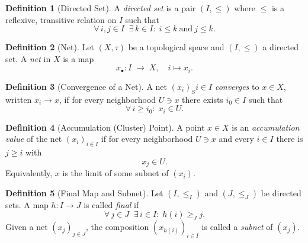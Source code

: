 \documentclass[11pt,a4paper]{article}
\theoremstyle{definition}
\newtheorem{definition}{Definition}[section]
\theoremstyle{plain}
\theoremstyle{remark}
\begin{document}
\begin{definition}[Directed Set]
A \emph{directed set} is a pair \((I,\le)\) where \(\le\) is a reflexive, transitive relation on \(I\) such that
\[
  \forall\,i,j\in I\;\;\exists\,k\in I:\;i\le k\ \text{and}\ j\le k.
\]
\end{definition}

\begin{definition}[Net]
Let \((X,\tau)\) be a topological space and \((I,\le)\) a directed set.  A \emph{net} in \(X\) is a map
\[
  x_\bullet\colon I \;\longrightarrow\; X,
  \quad i \mapsto x_i.
\]
\end{definition}

\begin{definition}[Convergence of a Net]
A net \((x_i)_S{i\in I}\) \emph{converges} to \(x\in X\), written \(x_i\to x\), if for every neighborhood \(U\ni x\) there exists \(i_0\in I\) such that
\[
  \forall\,i\ge i_0:\;x_i\in U.
\]
\end{definition}

\begin{definition}[Accumulation (Cluster) Point]
A point \(x\in X\) is an \emph{accumulation value} of the net \((x_i)_{i\in I}\) if for every neighborhood \(U\ni x\) and every \(i\in I\) there is \(j\ge i\) with
\[
  x_j\in U.
\]
Equivalently, \(x\) is the limit of some subnet of \((x_i)\).
\end{definition}

\begin{definition}[Final Map and Subnet]
Let \((I,\le_I)\) and \((J,\le_J)\) be directed sets.  A map \(h\colon I\to J\) is called \emph{final} if
\[
  \forall\,j\in J\;\;\exists\,i\in I:\;h(i)\ge_J j.
\]
Given a net \((x_j)_{j\in J}\), the composition \((x_{h(i)})_{i\in I}\) is called a \emph{subnet} of \((x_j)\).
\end{definition}
\end{document}
